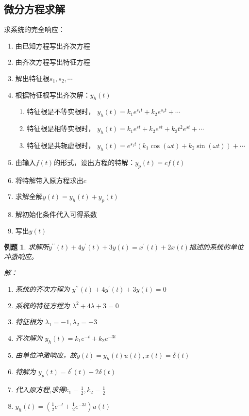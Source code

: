 \documentclass[UTF8]{ctexart}
\newtheorem{example}{例题}[section]
\begin{document}
    \subsection{微分方程求解}
    求系统的完全响应：
    \begin{enumerate}
        \item 由已知方程写出齐次方程
        \item 由齐次方程写出特征方程
        \item 解出特征根$s_1,s_2,\cdots$
        \item 根据特征根写出齐次解：$y_h(t)$
        \begin{enumerate}
            \item 特征根是不等实根时， $y_h(t) = k_1e^{s_1t}+k_2e^{s_2t}+\cdots$
            \item 特征根是相等实根时， $y_h(t) = k_1e^{st}+k_2e^{st}+k_2t^2e^{st}+\cdots$
            \item 特征根是共轭虚根时， $y_h(t) = e^{s_1t}(k_1\cos(\omega t) + k_2\sin(\omega t))+\cdots$
        \end{enumerate}
        \item 由输入$f(t)$的形式，设出方程的特解：$y_p(t) = cf(t)$
        \item 将特解带入原方程求出$c$ 
        \item 求解全解$y(t) = y_h(t)+y_p(t)$
        \item 解初始化条件代入可得系数
        \item 写出$y(t)$
    \end{enumerate}

    \begin{tcolorbox}[blue]
        \begin{example}
            求解所$y^{\prime\prime}(t)+4y^\prime(t)+3y(t)=x^\prime(t)+2x(t)$描述的系统的单位冲激响应。

            解：
            \begin{enumerate}
                \item 系统的齐次方程为 $y^{\prime\prime}(t)+4y^\prime(t)+3y(t)= 0$
                \item 系统的特征方程为 $\lambda^2 + 4\lambda + 3 = 0 $
                \item 特征根为 $\lambda_1 = -1 , \lambda_2 = -3$
                \item 齐次解为 $y_h(t) = k_1e^{-t} + k_2e^{-3t}$
                \item 由单位冲激响应，故$y(t) = y_h(t)u(t) , x(t) = \delta(t)$
                \item 特解为 $y_p(t)=\delta^\prime(t)+2\delta(t)$
                \item 代入原方程,求得$k_1=\frac{1}{2} , k_2 = \frac{1}{2}$
                \item $y_h(t) = (\frac{1}{2}e^{-t}+\frac{1}{2}e^{-3t})u(t)$

            \end{enumerate}
        \end{example}
    \end{tcolorbox}
\end{document}
